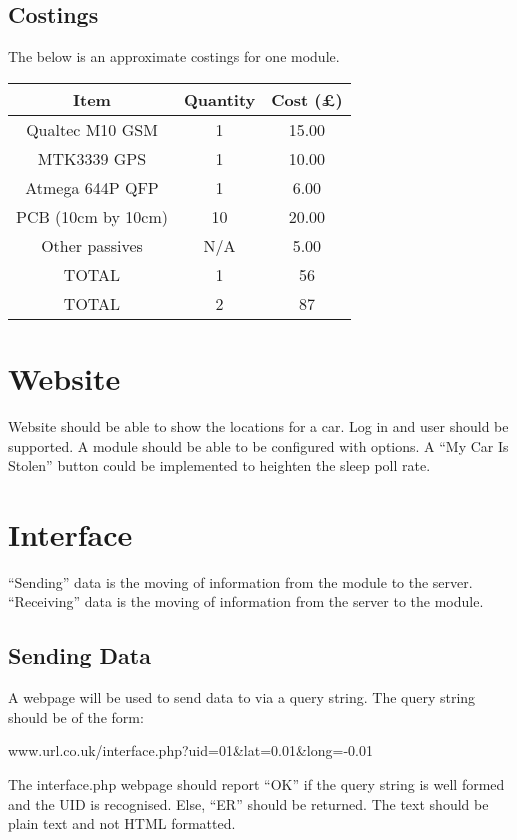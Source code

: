 \documentclass[12pt]{article}
\begin{document}
\subsection{Costings}
The below is an approximate costings for one module. 

\begin{table}[!h]
\begin{tabular}{ccc}
Item		&	Quantity	& 	Cost (\pounds) \\ \hline
Qualtec M10 GSM & 	1		& 	15.00 \\
MTK3339 GPS	&	1		&	10.00 \\
Atmega 644P QFP & 	1		&	6.00  \\
PCB (10cm by 10cm)&	10		&	20.00 \\
Other passives	&	N/A		&	5.00 \\ \hline
TOTAL		&	1		&	56 \\ \hline
TOTAL 		&	2		&	87 \\ \hline
\end{tabular}
\end{table}


\section{Website}

Website should be able to show the locations for a car. 
Log in and user should be supported. 
A module should be able to be configured with options.
A ``My Car Is Stolen'' button could be implemented to heighten the sleep poll rate. 

\section{Interface}

``Sending'' data is the moving of information from the module to the server.
``Receiving'' data is the moving of information from the server to the module.

\subsection{Sending Data}

A webpage will be used to send data to via a query string. 
The query string should be of the form:

\begin{listing}
www.url.co.uk/interface.php?uid=01\&lat=0.01\&long=-0.01
\end{listing}
The interface.php webpage should report ``OK'' if the query string is well formed and the UID is recognised. 
Else, ``ER'' should be returned. 
The text should be plain text and not HTML formatted.
\end{document}
